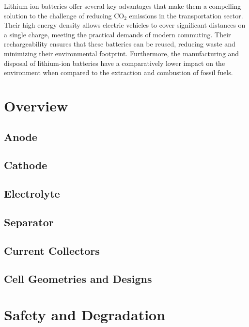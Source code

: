 Lithium-ion batteries offer several key advantages that make them a compelling solution to the challenge of reducing CO$_2$ emissions in the transportation sector. Their high energy density allows electric vehicles to cover significant distances on a single charge, meeting the practical demands of modern commuting. Their rechargeability ensures that these batteries can be reused, reducing waste and minimizing their environmental footprint. Furthermore, the manufacturing and disposal of lithium-ion batteries have a comparatively lower impact on the environment when compared to the extraction and combustion of fossil fuels.

\section{Overview}
\label{sec:overview}

\subsection{Anode}
\label{sec:anode}

\subsection{Cathode}
\label{sec:cathode}

\subsection{Electrolyte}
\label{sec:electrolyte}

\subsection{Separator}
\label{sec:separator}

\subsection{Current Collectors}
\label{sec:current-collectors}

\subsection{Cell Geometries and Designs}
\label{sec:cell-geometries-designs}

\section{Safety and Degradation}
\label{sec:safety-degradation}
